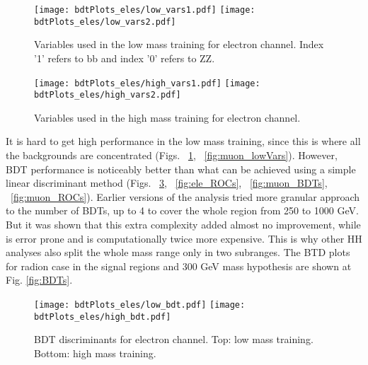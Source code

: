 \begin{figure}[tbp]
  \begin{center}
   \texttt{[image: bdtPlots\_eles/low\_vars1.pdf]}
   \texttt{[image: bdtPlots\_eles/low\_vars2.pdf]}
    \caption{ Variables used in the low mass training for electron channel. Index '1' refers to bb and index '0' refers to ZZ.}
    \label{fig:ele_lowVars}
  \end{center}
\end{figure}



\begin{figure}[tbp]
  \begin{center}
   \texttt{[image: bdtPlots\_eles/high\_vars1.pdf]}
   \texttt{[image: bdtPlots\_eles/high\_vars2.pdf]}
    \caption{ Variables used in the high mass training for electron channel.}
    \label{fig:ele_highVars}
  \end{center}
\end{figure}


It is hard to get high performance in the low mass training, since
this is where all the backgrounds are concentrated (Figs. ~\ref{fig:ele_lowVars}, ~\ref{fig:muon_lowVars}). However, BDT performance is noticeably better than what can be achieved using a
simple linear discriminant method (Figs. ~\ref{fig:ele_BDTs}, ~\ref{fig:ele_ROCs}, ~\ref{fig:muon_BDTs}, ~\ref{fig:muon_ROCs}). Earlier versions of the analysis tried more granular approach to the number of BDTs, up to 4 to cover the whole region from 250 to 1000 GeV. But it was shown that this extra complexity added almost no improvement, while is error prone and is computationally twice more expensive. This is why other HH analyses also split the whole mass range only in two subranges. The BTD plots for radion case in the signal regions and 300 GeV mass hypothesis are shown at Fig. \ref{fig:BDTs}.



\begin{figure}[tbp]
  \begin{center}
   \texttt{[image: bdtPlots\_eles/low\_bdt.pdf]}
   \texttt{[image: bdtPlots\_eles/high\_bdt.pdf]}
    \caption{ BDT discriminants for electron channel. Top: low mass training. Bottom: high mass training. }
    \label{fig:ele_BDTs}
  \end{center}
\end{figure}

